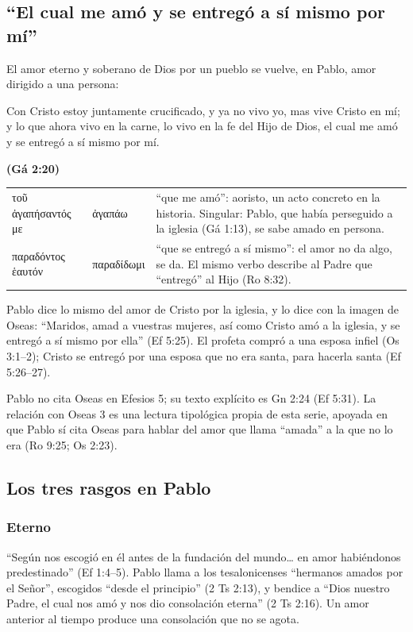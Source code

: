 \documentclass[11pt,letterpaper]{article}
\newcommand{\grc}[1]{\foreignlanguage{ancientgreek}{#1}}
\newcommand{\fuente}[1]{\par\hfill{\upshape\bfseries\small\textcolor{azul}{#1}}}
\begin{document}
\subsection{``El cual me amó y se entregó a sí mismo por mí''}
El amor eterno y soberano de Dios por un pueblo se vuelve, en Pablo, amor dirigido a una persona:

\begin{cita}Con Cristo estoy juntamente crucificado, y ya no vivo yo, mas vive Cristo en mí; y lo que ahora vivo en la carne, lo vivo en la fe del Hijo de Dios, el cual me amó y se entregó a sí mismo por mí.\fuente{(Gá 2:20)}\end{cita}

\begin{filologia}[Gá 2:20]
\begin{tabular}{@{}L{3.6cm}L{1.6cm}L{9.6cm}@{}}
\grc{τοῦ ἀγαπήσαντός με} & \grc{ἀγαπάω} & ``que me amó'': aoristo, un acto concreto en la historia. Singular: Pablo, que había perseguido a la iglesia (Gá 1:13), se sabe amado en persona. \\[2pt]
\grc{παραδόντος ἑαυτόν} & \grc{παραδίδωμι} & ``que se entregó a sí mismo'': el amor no da algo, se da. El mismo verbo describe al Padre que ``entregó'' al Hijo (Ro 8:32). \\
\end{tabular}
\end{filologia}

Pablo dice lo mismo del amor de Cristo por la iglesia, y lo dice con la imagen de Oseas: ``Maridos, amad a vuestras mujeres, así como Cristo amó a la iglesia, y se entregó a sí mismo por ella'' (Ef 5:25). El profeta compró a una esposa infiel (Os 3:1--2); Cristo se entregó por una esposa que no era santa, para hacerla santa (Ef 5:26--27).

\begin{nota}[Precisión]
Pablo no cita Oseas en Efesios 5; su texto explícito es Gn 2:24 (Ef 5:31). La relación con Oseas 3 es una lectura tipológica propia de esta serie, apoyada en que Pablo sí cita Oseas para hablar del amor que llama ``amada'' a la que no lo era (Ro 9:25; Os 2:23).
\end{nota}

\subsection{Los tres rasgos en Pablo}
\subsubsection*{Eterno}
``Según nos escogió en él antes de la fundación del mundo\ldots{} en amor habiéndonos predestinado'' (Ef 1:4--5). Pablo llama a los tesalonicenses ``hermanos amados por el Señor'', escogidos ``desde el principio'' (2 Ts 2:13), y bendice a ``Dios nuestro Padre, el cual nos amó y nos dio consolación eterna'' (2 Ts 2:16). Un amor anterior al tiempo produce una consolación que no se agota.
\end{document}
